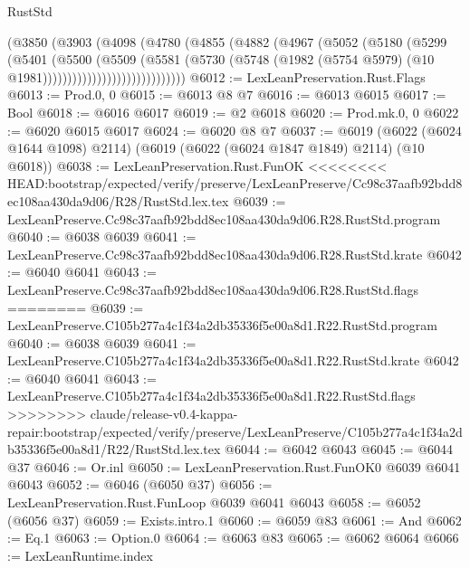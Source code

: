 \begin{lexlean}{RustStd}
\begin{coremodule}
{\begin{coremodule}
{{{{{{{{{{{{{{{{{{{{{{{{{{                          (@3850
                            (@3903
                              (@4098
                                (@4780
                                  (@4855
                                    (@4882
                                      (@4967
                                        (@5052
                                          (@5180
                                            (@5299
                                              (@5401
                                                (@5500
                                                  (@5509
                                                    (@5581
                                                      (@5730
                                                        (@5748
                                                          (@1982
                                                            (@5754 @5979)
                                                            (@10 @1981)))))))))))))))))))))))))))))
@6012 := LexLeanPreservation.Rust.Flags
@6013 := Prod.{0, 0}
@6015 := @6013 @8 @7
@6016 := @6013 @6015
@6017 := Bool
@6018 := @6016 @6017
@6019 := @2 @6018
@6020 := Prod.mk.{0, 0}
@6022 := @6020 @6015 @6017
@6024 := @6020 @8 @7
@6037 := @6019
    (@6022 (@6024 @1644 @1098) @2114)
    (@6019 (@6022 (@6024 @1847 @1849) @2114) (@10 @6018))
@6038 := LexLeanPreservation.Rust.FunOK
<<<<<<<< HEAD:bootstrap/expected/verify/preserve/LexLeanPreserve/Cc98c37aafb92bdd8ec108aa430da9d06/R28/RustStd.lex.tex
@6039 := LexLeanPreserve.Cc98c37aafb92bdd8ec108aa430da9d06.R28.RustStd.program
@6040 := @6038 @6039
@6041 := LexLeanPreserve.Cc98c37aafb92bdd8ec108aa430da9d06.R28.RustStd.krate
@6042 := @6040 @6041
@6043 := LexLeanPreserve.Cc98c37aafb92bdd8ec108aa430da9d06.R28.RustStd.flags
========
@6039 := LexLeanPreserve.C105b277a4c1f34a2db35336f5e00a8d1.R22.RustStd.program
@6040 := @6038 @6039
@6041 := LexLeanPreserve.C105b277a4c1f34a2db35336f5e00a8d1.R22.RustStd.krate
@6042 := @6040 @6041
@6043 := LexLeanPreserve.C105b277a4c1f34a2db35336f5e00a8d1.R22.RustStd.flags
>>>>>>>> claude/release-v0.4-kappa-repair:bootstrap/expected/verify/preserve/LexLeanPreserve/C105b277a4c1f34a2db35336f5e00a8d1/R22/RustStd.lex.tex
@6044 := @6042 @6043
@6045 := @6044 @37
@6046 := Or.inl
@6050 := LexLeanPreservation.Rust.FunOK0 @6039 @6041 @6043
@6052 := @6046 (@6050 @37)
@6056 := LexLeanPreservation.Rust.FunLoop @6039 @6041 @6043
@6058 := @6052 (@6056 @37)
@6059 := Exists.intro.{1}
@6060 := @6059 @83
@6061 := And
@6062 := Eq.{1}
@6063 := Option.{0}
@6064 := @6063 @83
@6065 := @6062 @6064
@6066 := LexLeanRuntime.index
}}}}}}}}}}}}}}}}}}}}}}}}}}
\end{coremodule}}
\end{coremodule}
\end{lexlean}
